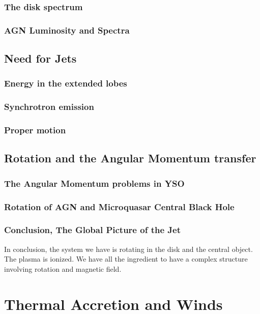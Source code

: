 \documentclass[10pt,a4paper]{article}
\begin{document}
\subsubsection{The disk spectrum}
\subsubsection{AGN Luminosity and Spectra}

\subsection{Need for Jets}
\subsubsection{Energy in the extended lobes}
\subsubsection{Synchrotron emission}
\subsubsection{Proper motion}

\subsection{Rotation and the Angular Momentum transfer}
\subsubsection{The Angular Momentum problems in YSO}
\subsubsection{Rotation of AGN and Microquasar Central Black Hole}
\subsubsection{Conclusion, The Global Picture of the Jet}

In conclusion, the system we have is rotating in the disk and the central object. The plasma is ionized. We have all the ingredient to have a complex structure involving rotation and magnetic field.

\section{Thermal Accretion and Winds}
\end{document}
